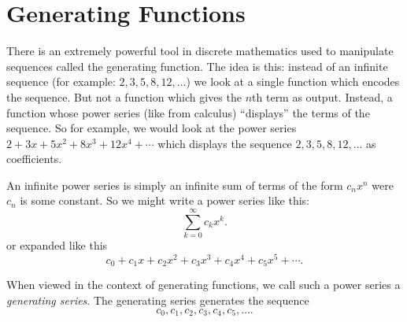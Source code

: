 \documentclass[10pt,]{book}
\theoremstyle{plain}
\theoremstyle{definition}
\theoremstyle{definition}
\theoremstyle{definition}
\numberwithin{equation}{chapter}
\begin{document}
\section[Generating Functions]{Generating Functions}\label{section-29}
\typeout{************************************************}
\typeout{************************************************}

There is an extremely powerful tool in discrete mathematics used to manipulate sequences called the generating function. The idea is this: instead of an infinite sequence (for example: \(2, 3, 5, 8, 12, \ldots\)) we look at a single function which encodes the sequence. But not a function which gives the \(n\)th term as output. Instead, a function whose power series (like from calculus) ``displays'' the terms of the sequence. So for example, we would look at the power series \(2 + 3x + 5x^2 + 8x^3 + 12x^4 + \cdots\) which displays the sequence \(2, 3, 5, 8, 12, \ldots\) as coefficients.
%
\par

An infinite power series is simply an infinite sum of terms of the form \(c_nx^n\) were \(c_n\) is some constant. So we might write a power series like this:
\begin{equation*}
  \sum_{k=0}^\infty c_k x^k.
\end{equation*}
or expanded like this
\begin{equation*}
  c_0 + c_1x + c_2x^2 + c_3x^3 + c_4x^4 + c_5x^5 + \cdots.
\end{equation*}
%
\par

When viewed in the context of generating functions, we call such a power series a \emph{generating series}. The generating series generates the sequence
\begin{equation*}
  c_0, c_1, c_2, c_3, c_4, c_5, \ldots.
\end{equation*}
%
\par
\end{document}
